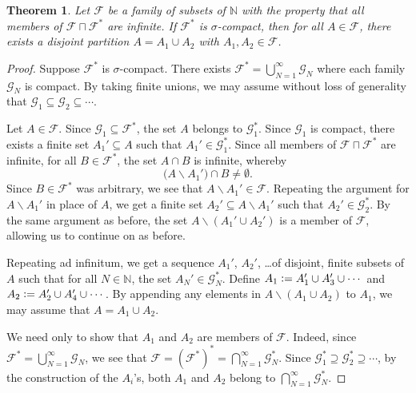 \documentclass[letter,11pt]{article}
\theoremstyle{plain}
\newtheorem{theorem}{Theorem}
\theoremstyle{definition}
\theoremstyle{plain}
\theoremstyle{plain}
\numberwithin{equation}{section}
\newcommand{\N}{\mathbb{N}}
\newcommand{\defeq}{\vcentcolon=}
\renewcommand{\setminus}{\backslash}
\newcommand{\classcap}{\sqcap}
\newcommand{\family}{\mathscr{F}}
\newcommand{\familytwo}{\mathscr{G}}
\begin{document}
\begin{theorem}
\label{prop:sigma-compact-implies-partition-to-two}
    Let $\family$ be a family of subsets of $\N$ with the property that all members of $\family \classcap \family^*$ are infinite.  If $\family^*$ is $\sigma$-compact, then for all $A \in \family$, there exists a disjoint partition $A = A_1 \cup A_2$ with $A_1, A_2 \in \family$.
\end{theorem}

\begin{proof}
    Suppose $\family^*$ is $\sigma$-compact. There exists $\family^* = \bigcup_{N=1}^{\infty} \familytwo_N$ where each family $\familytwo_N$ is compact. By taking finite unions, we may assume without loss of generality that $\familytwo_1 \subseteq \familytwo_2 \subseteq \cdots$.
    
    Let $A \in \family$. Since $\familytwo_1 \subseteq \family^*$, the set $A$ belongs to $\familytwo_1^*$. Since $\familytwo_1$ is compact, there exists a finite set $A_1' \subseteq A$ such that $A_1' \in \familytwo_1^*$. Since all members of $\family \classcap \family^*$ are infinite, for all $B \in \family^*$, the set $A \cap B$ is infinite, whereby
    \[
        \big(A \setminus A_1' \big) \cap B \neq \emptyset. 
    \]
    Since $B \in \family^*$ was arbitrary, we see that $A \setminus A_1' \in \family$. Repeating the argument for $A \setminus A_1'$ in place of $A$, we get a finite set $A_2' \subseteq A \setminus A_1'$ such that $A_2' \in \familytwo_2^*$. By the same argument as before, the set $A \setminus (A_1' \cup A_2')$ is a member of $\family$, allowing us to continue on as before.
    
    Repeating ad infinitum, we get a sequence $A_1'$, $A_2'$, \dots of disjoint, finite subsets of $A$ such that for all $N \in \N$, the set $A_N' \in \familytwo_N^*$.  Define $A_1 \defeq A_1' \cup A_3' \cup \cdots$ and $A_2 \defeq A_2' \cup A_4' \cup \cdots$.  By appending any elements in $A \setminus (A_1 \cup A_2)$ to $A_1$, we may assume that $A = A_1 \cup A_2$.
    
    We need only to show that $A_1$ and $A_2$ are members of $\family$.  Indeed, since $\family^* = \bigcup_{N=1}^{\infty} \familytwo_N$, we see that $\family = (\family^*)^* = \bigcap_{N=1}^{\infty} \familytwo_N^*$.  Since $\familytwo_1^* \supseteq \familytwo_2^* \supseteq \cdots$, by the construction of the $A_i$'s, both $A_1$ and $A_2$ belong to $\bigcap_{N=1}^{\infty} \familytwo_N^*$.
\end{proof}
\end{document}

